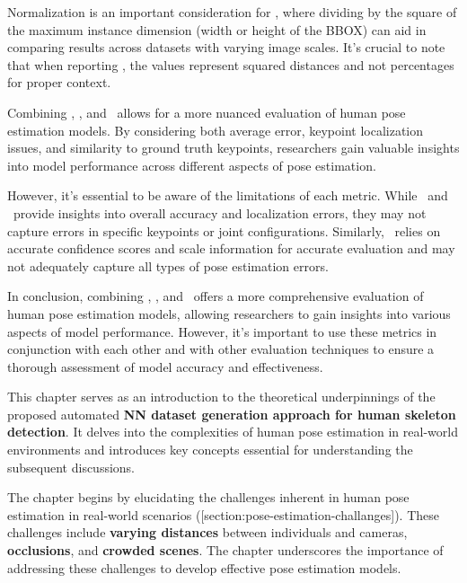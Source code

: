 Normalization is an important consideration for \MSE, where dividing by the square of the maximum instance dimension (width or height of the BBOX) can aid in comparing results across datasets with varying image scales. It's crucial to note that when reporting \MSE, the values represent squared distances and not percentages for proper context.

Combining \APE, \MSE, and \OKS\ allows for a more nuanced evaluation of human pose estimation models. By considering both average error, keypoint localization issues, and similarity to ground truth keypoints, researchers gain valuable insights into model performance across different aspects of pose estimation.

However, it's essential to be aware of the limitations of each metric. While \APE\ and \MSE\ provide insights into overall accuracy and localization errors, they may not capture errors in specific keypoints or joint configurations. Similarly, \OKS\ relies on accurate confidence scores and scale information for accurate evaluation and may not adequately capture all types of pose estimation errors.

In conclusion, combining \APE, \MSE, and \OKS\ offers a more comprehensive evaluation of human pose estimation models, allowing researchers to gain insights into various aspects of model performance. However, it's important to use these metrics in conjunction with each other and with other evaluation techniques to ensure a thorough assessment of model accuracy and effectiveness.

This chapter serves as an introduction to the theoretical underpinnings of the proposed automated {\bf NN dataset generation approach for human skeleton detection}. It delves into the complexities of human pose estimation in real-world environments and introduces key concepts essential for understanding the subsequent discussions.


The chapter begins by elucidating the challenges inherent in human pose estimation in real-world scenarios ([section:pose-estimation-challanges]). These challenges include {\bf varying distances} between individuals and cameras, {\bf occlusions}, and {\bf crowded scenes}. The chapter underscores the importance of addressing these challenges to develop effective pose estimation models.


